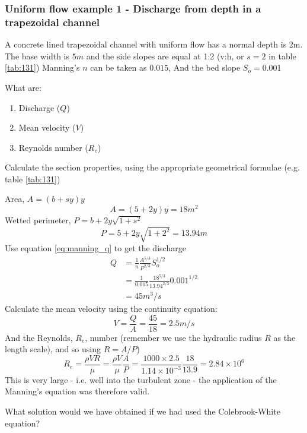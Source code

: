 \documentclass[a4paper, 12pt, british]{article} %
\numberwithin{equation}{section}
\numberwithin{figure}{section}
\numberwithin{table}{section}
\begin{document}
\subsubsection{Uniform flow example 1 - Discharge from depth in a trapezoidal channel}

A concrete lined trapezoidal channel with uniform flow has a normal depth is 2m. 
The base width is $5m$ and the side slopes are equal at 1:2 (v:h, or $s=2$ in table \ref{tab:131})
Manning's $n$ can be taken as $0.015$, 
And the bed slope $S_o = 0.001$

What are:
\begin{enumerate}[label=\alph*]
	\item Discharge ($Q$)
	\item Mean velocity ($V$)
	\item Reynolds number ($R_e$)
\end{enumerate}
Calculate the section properties, using the appropriate geometrical formulae (e.g. table \ref{tab:131})

Area, $A =(b+sy)y$  
\begin{equation*}
A= (5 + 2y)y = 18m^2
\end{equation*}
Wetted perimeter, $P =b+2y\sqrt{1+s^2}$
\begin{equation*}
P= 5 + 2y\sqrt{1+2^2} = 13.94m
\end{equation*}
Use equation \ref{eq:manning_q} to get the discharge
\begin{align*}
Q &= \frac{1}{n}\frac{A^{5/3}}{P^{2/3}}S_o^{1/2} \\
&= \frac{1}{0.015}\frac{18^{5/3}}{13.94^{2/3}}0.001^{1/2}\\
& = 45 m^3/s
\end{align*}
Calculate the mean velocity using the continuity equation:
\begin{equation*}
V= \frac{Q}{A}=\frac{45}{18}=2.5 m/s
\end{equation*}
And the Reynolds, $R_e$, number (remember we use the hydraulic radius $R$  as the length scale), and so using $R=A/P$)
\begin{equation*}
R_e = \frac{\rho V R}{\mu} = \frac{\rho V}{\mu}\frac{A}{P} =\frac{1000 \times 2.5}{1.14\times 10^{-3} }\frac{18}{13.9} = 2.84 \times 10^6
\end{equation*}
This is very large - i.e. well into the turbulent zone - the application of the Manning's equation was therefore valid. 

What solution would we have obtained if we had used the Colebrook-White equation?
\end{document}

